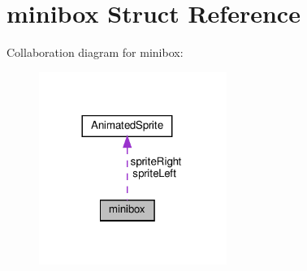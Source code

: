 \hypertarget{structminibox}{}\section{minibox Struct Reference}
\label{structminibox}


Collaboration diagram for minibox\+:
\nopagebreak
\begin{figure}[H]
\begin{center}
\leavevmode
\includegraphics[width=173pt]{structminibox__coll__graph}
\end{center}
\end{figure}
